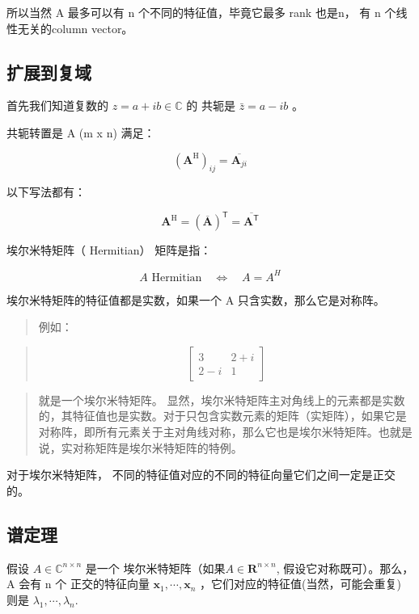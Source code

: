 \documentclass[
]{book}
\begin{document}
所以当然 A 最多可以有 n 个不同的特征值，毕竟它最多 rank 也是n， 有 n 个线性无关的column vector。

\hypertarget{ux6269ux5c55ux5230ux590dux57df}{%
\subsection{扩展到复域}\label{ux6269ux5c55ux5230ux590dux57df}}

首先我们知道复数的 \(z = a + ib \in \mathbb{C}\) 的 共轭是 \(\bar{z} = a - ib\) 。

共轭转置是 A (m x n) 满足：

\[{\displaystyle \left({\boldsymbol {A}}^{\mathrm {H} }\right)_{ij}={\overline {{\boldsymbol {A}}_{ji}}}}   \]

以下写法都有：

\[{\boldsymbol {A}}^{\mathrm {H} }=\left({\overline {\boldsymbol {A}}}\right)^{\mathsf {T}}={\overline {{\boldsymbol {A}}^{\mathsf {T}}}}\]

埃尔米特矩阵（ Hermitian） 矩阵是指：

\[{\displaystyle A{\text{ Hermitian}}\quad \iff \quad A= {A^H}}\]

埃尔米特矩阵的特征值都是实数，如果一个 A 只含实数，那么它是对称阵。

\begin{quote}
例如：
\end{quote}

\begin{quote}
\[{\begin{bmatrix}3&2+i\\2-i&1\end{bmatrix}}\]
\end{quote}

\begin{quote}
就是一个埃尔米特矩阵。
显然，埃尔米特矩阵主对角线上的元素都是实数的，其特征值也是实数。对于只包含实数元素的矩阵（实矩阵），如果它是对称阵，即所有元素关于主对角线对称，那么它也是埃尔米特矩阵。也就是说，实对称矩阵是埃尔米特矩阵的特例。
\end{quote}

对于埃尔米特矩阵， 不同的特征值对应的不同的特征向量它们之间一定是正交的。

\hypertarget{ux8c31ux5b9aux7406}{%
\subsection{谱定理}\label{ux8c31ux5b9aux7406}}

假设 \(A \in \mathbb{C}^{n \times n}\) 是一个 埃尔米特矩阵（如果\(A \in\mathbf{R}^{n \times n}\), 假设它对称既可）。那么， A 会有 n 个 正交的特征向量 \(\mathbf{x}_1, \cdots, \mathbf{x}_n\) ，它们对应的特征值(当然，可能会重复) 则是 \(\lambda_1,\cdots, \lambda_n\).
\end{document}
